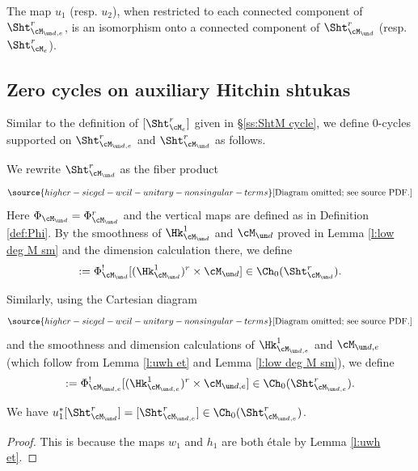 \begin{lemma}
\notready\label{l:ShtM isom}
The map $u_{1}$ (resp. $u_{2}$), when restricted to each connected component of $\Sht^{r}_{\cM_{\un d,e}}$, is an isomorphism onto a connected component of $\Sht^{r}_{\cM_{\un d}}$ (resp. $\Sht^{r}_{\cM_{e}}$).
\end{lemma}


\subsection{Zero cycles on auxiliary Hitchin shtukas}
Similar to the definition of $[\Sht^{r}_{\cM_{e}}]$ given in \S\ref{ss:ShtM cycle}, we define $0$-cycles supported on $\Sht^{r}_{\cM_{\un d,e}}$ and $\Sht^{r}_{\cM_{\un d}}$ as follows.

We rewrite $\Sht^{r}_{\cM_{\un d}}$ as the fiber product
\begin{equation}\label{rewrite ShtM und}
\source{higher-siegel-weil-unitary-nonsingular-terms}
\text{[Diagram omitted; see source PDF.]}
\end{equation}
Here $\Phi_{\cM_{\un d}}=\Phi^{r}_{\cM_{\un d}}$ and the vertical maps are defined as in Definition \ref{def:Phi}. By the smoothness of $\Hk^{1}_{\cM_{\un d}}$ and $\cM_{\un d}$ proved in Lemma \ref{l:low deg M sm} and the dimension calculation there, we define
\begin{equation}
[\Sht^{r}_{\cM_{\un d}}]:=\Phi_{\cM_{\un d}}^{!}[(\Hk^{1}_{\cM_{\un d}})^{r} \times \cM_{\un d}]\in\Ch_{0}(\Sht^{r}_{\cM_{\un d}}).
\end{equation}

Similarly, using the Cartesian diagram
\begin{equation}\label{rewrite ShtMde}
\source{higher-siegel-weil-unitary-nonsingular-terms}
\text{[Diagram omitted; see source PDF.]}
\end{equation}
and the smoothness and dimension calculations of $\Hk^{1}_{\cM_{\un d,e}}$ and $\cM_{\un d, e}$ (which follow from Lemma \ref{l:uwh et} and Lemma \ref{l:low deg M sm}), we define
\begin{equation}
[\Sht^{r}_{\cM_{\un d, e}}]:=\Phi_{\cM_{\un d,e}}^{!}[(\Hk^{1}_{\cM_{\un d, e}})^{r} \times \cM_{\un d, e}]\in\Ch_{0}(\Sht^{r}_{\cM_{\un d ,e}}).
\end{equation}


\begin{lemma}
\notready\label{l:u1}
We have $u_{1}^{*}[\Sht^{r}_{\cM_{\un d}}]=[\Sht^{r}_{\cM_{\un d,e}}]\in \Ch_{0}(\Sht^{r}_{\cM_{\un d,e}})
$.
\end{lemma}
\begin{proof}
This is because the maps $w_{1}$ and $h_{1}$ are both \'etale by Lemma \ref{l:uwh et}.
\end{proof}


